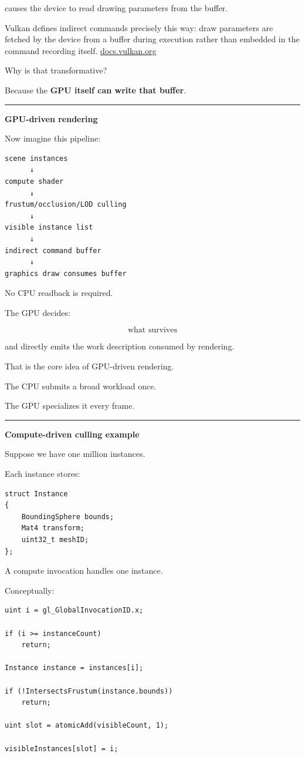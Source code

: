 causes the device to read drawing parameters from the buffer.

Vulkan defines indirect commands precisely this way: draw parameters are fetched by the device from a buffer during execution rather than embedded in the command recording itself. \href{https://docs.vulkan.org/refpages/latest/refpages/source/vkCmdDrawIndirect.html?utm_source=chatgpt.com}{docs.vulkan.org}

Why is that transformative?

Because the \textbf{GPU itself can write that buffer}.

\begin{center}\rule{0.5\linewidth}{0.5pt}\end{center}

\textbf{GPU-driven rendering}

Now imagine this pipeline:

\begin{verbatim}
scene instances
      ↓
compute shader
      ↓
frustum/occlusion/LOD culling
      ↓
visible instance list
      ↓
indirect command buffer
      ↓
graphics draw consumes buffer
\end{verbatim}

No CPU readback is required.

The GPU decides:

\[
\text{what survives}
\]

and directly emits the work description consumed by rendering.

That is the core idea of GPU-driven rendering.

The CPU submits a broad workload once.

The GPU specializes it every frame.

\begin{center}\rule{0.5\linewidth}{0.5pt}\end{center}

\textbf{Compute-driven culling example}

Suppose we have one million instances.

Each instance stores:

\begin{verbatim}
struct Instance
{
    BoundingSphere bounds;
    Mat4 transform;
    uint32_t meshID;
};
\end{verbatim}

A compute invocation handles one instance.

Conceptually:

\begin{verbatim}
uint i = gl_GlobalInvocationID.x;

if (i >= instanceCount)
    return;

Instance instance = instances[i];

if (!IntersectsFrustum(instance.bounds))
    return;

uint slot = atomicAdd(visibleCount, 1);

visibleInstances[slot] = i;
\end{verbatim}

